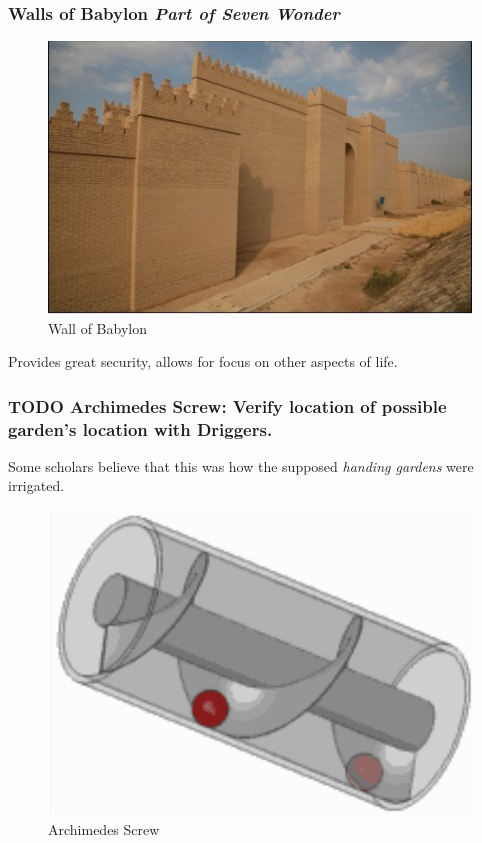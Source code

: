 \documentclass[11pt]{article}
\begin{document}
\subsubsection{Walls of Babylon \emph{Part of \textbf{Seven Wonder}}}
\label{sec-3-8-1}
\begin{figure}[htb]
\centering
\includegraphics[width=.9\linewidth]{./img/WallsBabylon.png}
\caption{Wall of Babylon}
\end{figure}

Provides great security, allows for focus on other aspects of life.

\subsubsection{{\bfseries\sffamily TODO} Archimedes Screw: Verify location of possible garden's location with Driggers.}
\label{sec-3-8-2}
Some scholars believe that this was how the supposed \emph{handing gardens} were irrigated.
\begin{figure}[htb]
\centering
\includegraphics[width=.9\linewidth]{./img/archScrew.png}
\caption{Archimedes Screw}
\end{figure}
\end{document}

